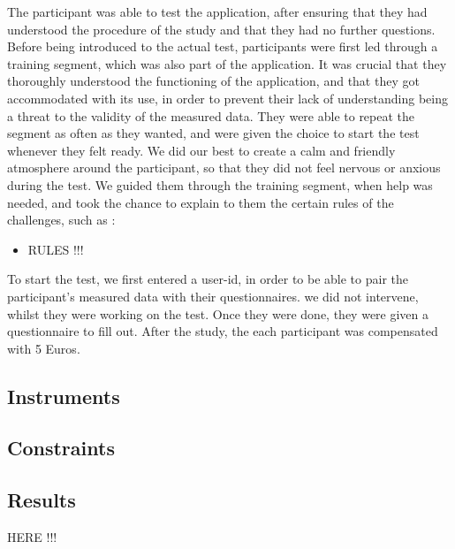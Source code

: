 The participant was able to test the application, after ensuring that they had understood the procedure of the study and that they had no further questions. Before being introduced to the actual test, participants were first led through a training segment, which was also part of the application. It was crucial that they thoroughly understood the functioning of the application, and that they got accommodated with its use, in order to prevent their lack of understanding being a threat to the validity of the measured data. They were able to repeat the segment as often as they wanted, and were given the choice to start the test whenever they felt ready. We did our best to create a calm and friendly atmosphere around the participant, so that they did not feel nervous or anxious during the test. We guided them through the training segment, when help was needed, and took the chance to explain to them the certain rules of the challenges, such as :

\begin{itemize}
    \item RULES !!!
\end{itemize}

To start the test, we first entered a user-id, in order to be able to pair the participant's measured data with their questionnaires. we did not intervene, whilst they were working on the test. Once they were done, they were given a questionnaire to fill out. After the study, the each participant was compensated with 5 Euros.

\subsection{Instruments}

\subsection{Constraints}

\subsection{Results}
HERE !!! 
